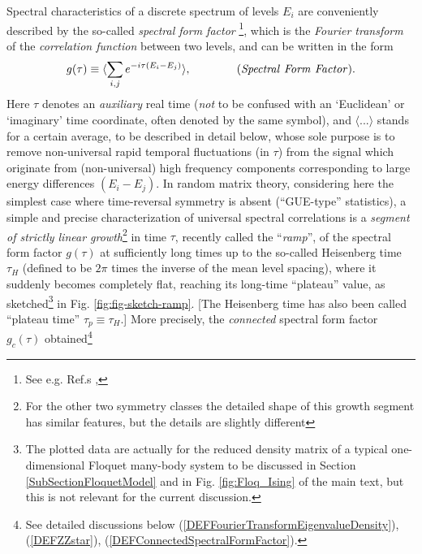 \documentclass[aps,prb,preprint,onecolumn,amsmath,amssymb,superscriptaddress,eqsecnum,floatfix,scrartcl]{revtex4-1}
\begin{document}
Spectral  characteristics of a discrete spectrum of levels $E_i$ are  conveniently
described by the so-called {\it spectral form factor}
\footnote{See e.g. Ref.s ,
}, which is  the {\it Fourier transform} of the
 {\it correlation function} between two levels, and  can be written in the form
\begin{eqnarray}
\label{IntroSpectralFormfactor}
g(\tau)\equiv  \langle\sum_{i,j} e^{-i \tau (E_i-E_j)}\rangle, \qquad  \qquad {\rm ({\it Spectral \ Form \ Factor})}.
\end{eqnarray}
Here $\tau$ denotes  an {\it auxiliary}  real time ({\it not} to be confused with  an `Euclidean' or `imaginary' time coordinate, often denoted by the same symbol), and $\langle ... \rangle$ 
stands for  a certain  average,
to be described in detail below, whose sole  purpose is to remove non-universal rapid temporal fluctuations  (in $\tau$) 
from the signal which originate from  (non-universal) 
high frequency components corresponding to large energy differences $(E_i-E_j)$.
In random matrix theory, considering here  the  simplest case where time-reversal symmetry
is absent  (``GUE-type'' statistics),
a simple and precise characterization of 
universal spectral correlations  is a {\it segment of strictly  linear  
growth}\footnote{For the other two  symmetry classes the detailed shape  of this growth segment has similar features, but the details are slightly different} 
 in time $\tau$, recently called\cite{Cotler2016}
 the  ``{\it ramp}'',  of  the spectral form factor $g(\tau)$ at  sufficiently long   times
 up to the
so-called Heisenberg time
$\tau_H$ (defined to be $2\pi$ times the inverse of the mean level spacing), 
where it  suddenly becomes completely flat, reaching its long-time ``plateau'' value, as 
sketched\footnote{The plotted data are actually for
the reduced density matrix of
a typical one-dimensional Floquet many-body system to be discussed in Section \ref{SubSectionFloquetModel} and in   Fig. \ref{fig:Floq_Ising}
of the main text, but this is not relevant for the current discussion.}
 in Fig. \ref{fig:fig-sketch-ramp}.
[The Heisenberg time has  also been  called ``plateau time'' $\tau_p\equiv \tau_H$.]
More precisely, the {\it connected} spectral form factor $g_c(\tau)$ 
obtained\footnote{See detailed  discussions below  
(\ref{DEFFourierTransformEigenvalueDensity}), (\ref{DEFZZstar}), (\ref{DEFConnectedSpectralFormFactor}).}
\end{document}
